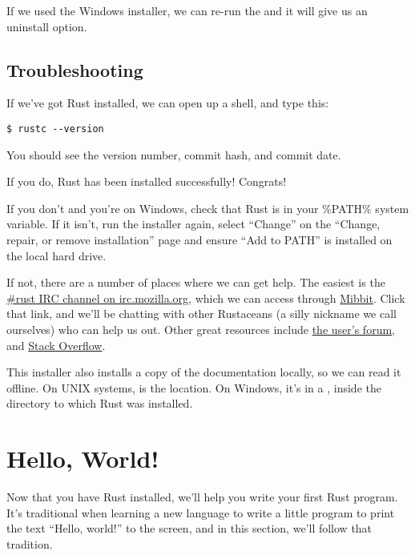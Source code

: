 If we used the Windows installer, we can re-run the  and it will give us an uninstall option.

\subsection*{Troubleshooting}

If we've got Rust installed, we can open up a shell, and type this:

\begin{verbatim}
$ rustc --version
\end{verbatim}

You should see the version number, commit hash, and commit date.

\blank

If you do, Rust has been installed successfully! Congrats!

\blank

If you don't and you're on Windows, check that Rust is in your \%PATH\% system variable. If it isn't, run the installer again, 
select \enquote{Change} on the \enquote{Change, repair, or remove installation} page and ensure \enquote{Add to PATH} is installed 
on the local hard drive.

\blank

If not, there are a number of places where we can get help. The easiest is the 
\href{irc://irc.mozilla.org/\#rust}{\#rust IRC channel on irc.mozilla.org}, which we can access through
\href{http://chat.mibbit.com/?server=irc.mozilla.org&channel=\%23rust}{Mibbit}. Click that link, and we'll be chatting with other 
Rustaceans (a silly nickname we call ourselves) who can help us out. Other great resources include 
\href{https://users.rust-lang.org/}{the user's forum}, and \href{http://stackoverflow.com/questions/tagged/rust}{Stack Overflow}.

\blank

This installer also installs a copy of the documentation locally, so we can read it offline. On UNIX systems,  
is the location. On Windows, it's in a , inside the directory to which Rust was installed.

\section{Hello, World!}

Now that you have Rust installed, we'll help you write your first Rust program. It's traditional when learning a new language 
to write a little program to print the text \enquote{Hello, world!} to the screen, and in this section, we'll follow that 
tradition.

